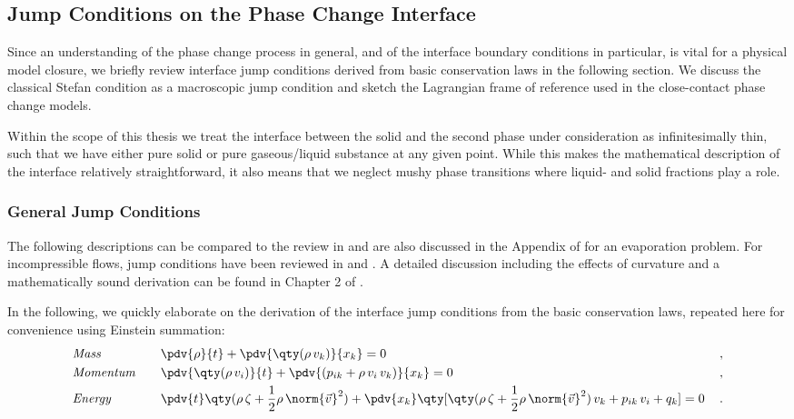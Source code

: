 \subsection{Jump Conditions on the Phase Change Interface}\label{sec:interfacedescription}

Since an understanding of the phase change process in general, and of the interface boundary conditions in particular, is vital for a physical model closure, we briefly review interface jump conditions derived from basic conservation laws in the following section. We discuss the  classical Stefan condition as a macroscopic jump condition and sketch the Lagrangian frame of reference used in the close-contact phase change models.

Within the scope of this thesis we treat the interface between the solid and the second phase under consideration as infinitesimally thin, such that we have either pure solid or pure gaseous/liquid substance at any given point. While this makes the mathematical description of the interface relatively straightforward, it also means that we neglect mushy phase transitions where liquid- and solid fractions play a role. 

\subsubsection{General Jump Conditions}

The following descriptions can be compared to the review in \cite{mueller1985thermodynamics} and are also discussed in the Appendix of \cite{struchtrup2017evaporation} for an evaporation problem. For incompressible flows, jump conditions have been reviewed in \cite{reitzle2019directsubli} and \cite{myers2020stefan}. A detailed discussion including the effects of curvature and a mathematically sound derivation can be found in Chapter 2 of \cite{ishii2010thermo}.

In the following, we quickly elaborate on the derivation of the interface jump conditions from the basic conservation laws, repeated here for convenience using Einstein summation:
\begin{subequations}\label{eq:convjump}
\begin{flalign}
    &\textit{Mass} \quad && \pdv{\rho}{t}+\pdv{\qty(\rho\, v_k )}{x_k} =0 & \, , \label{eq:massconvjump}\\
    &\textit{Momentum} \quad && \pdv{\qty(\rho\, v_i)}{t}+\pdv{(p_{ik}+\rho\, v_i\, v_k)}{x_k}= 0& \, ,\label{eq:momconvjump}\\
    &\textit{Energy} \quad &&  \pdv{t}\qty(\rho\, \zeta + \frac{1}{2}\rho\,\norm{\Vec{v}}^2)+\pdv{x_k}\qty[\qty(\rho \,\zeta + \frac{1}{2}\rho\,\norm{\Vec{v}}^2) \,v_k + p_{ik}\,v_i+q_k]=0 &\, .  \label{eq:energyconvjump}
\end{flalign}
\end{subequations}

